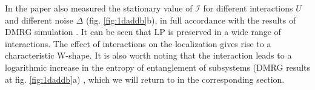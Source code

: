 In the paper also measured the stationary value of $\mathcal{I}$ for different interactions $U$ and different noise $\Delta$ (fig. \ref{fig:1daddb}b), in full accordance with the results of DMRG simulation 
\cite{PhysRevLett.69.2863}. 
It can be seen that LP is preserved in a wide range of interactions. The effect of interactions on the localization gives rise to a characteristic W-shape. It is also worth noting that the interaction leads to a logarithmic increase in the entropy of entanglement of subsystems (DMRG results at fig. \ref{fig:1daddb}a)
, which we will return to in the corresponding section.



